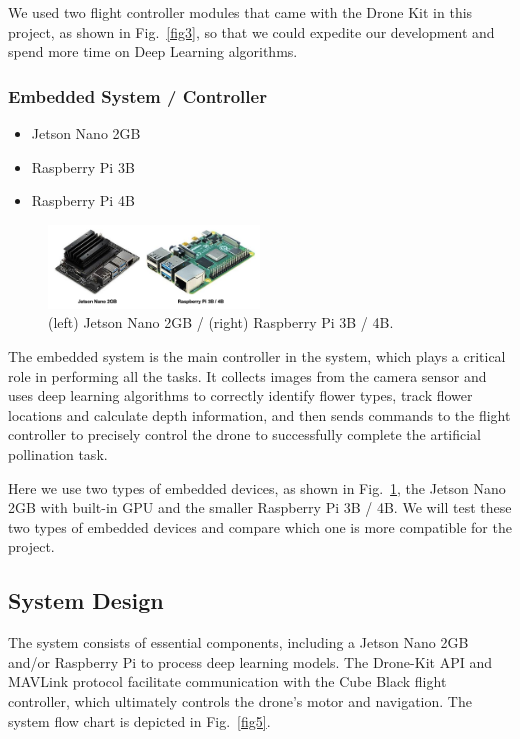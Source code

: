     We used two flight controller modules that came with the Drone Kit in this project, as shown in Fig.~\ref{fig3}, so that we could expedite our development and spend more time on Deep Learning algorithms.
    
    \subsubsection{Embedded System / Controller}\label{subsection:A4}
    \begin{itemize}
        \item Jetson Nano 2GB
        \item Raspberry Pi 3B
        \item Raspberry Pi 4B
    \end{itemize}

     \begin{figure}[H]
        \centerline{\includegraphics[width=0.5\textwidth]{Figures/Methods/Embedded_Systems.png}}
        \caption{(left) Jetson Nano 2GB / (right) Raspberry Pi 3B / 4B.}
        \label{fig4}
    \end{figure}

    The embedded system is the main controller in the system, which plays a critical role in performing all the tasks. It collects images from the camera sensor and uses deep learning algorithms to correctly identify flower types, track flower locations and calculate depth information, and then sends commands to the flight controller to precisely control the drone to successfully complete the artificial pollination task.

    Here we use two types of embedded devices, as shown in Fig.~\ref{fig4}, the Jetson Nano 2GB with built-in GPU and the smaller Raspberry Pi 3B / 4B. We will test these two types of embedded devices and compare which one is more compatible for the project.

\subsection{System Design}\label{subsection:B}

The system consists of essential components, including a Jetson Nano 2GB and/or Raspberry Pi to process deep learning models. The Drone-Kit API and MAVLink protocol facilitate communication with the Cube Black flight controller, which ultimately controls the drone's motor and navigation. The system flow chart is depicted in Fig.~\ref{fig5}.

